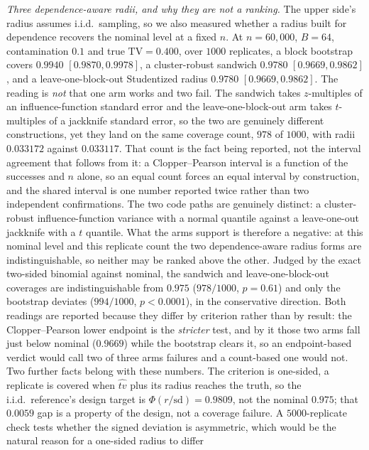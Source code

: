 \documentclass[sigconf,anonymous,review]{acmart}
\newcommand{\tv}{\mathrm{TV}}
\begin{document}
\emph{Three dependence-aware radii, and why they are not a ranking.} The
upper side's radius assumes i.i.d.\ sampling, so we also measured whether a
radius built for dependence recovers the nominal level at a fixed $n$. At $n{=}60{,}000$, $B{=}64$,
contamination $0.1$ and true $\tv = 0.400$, over $1000$ replicates, a block
bootstrap covers $0.9940$ $[0.9870, 0.9978]$, a cluster-robust sandwich $0.9780$
$[0.9669, 0.9862]$, and a leave-one-block-out Studentized radius $0.9780$
$[0.9669, 0.9862]$. The reading is \emph{not} that one arm works and two fail.
The sandwich takes $z$-multiples of an influence-function standard error and the
leave-one-block-out arm takes $t$-multiples of a jackknife standard error, so the
two are genuinely different constructions, yet they land on the same coverage
count, $978$ of $1000$, with radii $0.033172$ against $0.033117$. That count is
the fact being reported, not the interval agreement that follows from it: a
Clopper--Pearson interval is a function of the successes and $n$ alone, so an
equal count forces an equal interval by construction, and the shared interval is
one number reported twice rather than two independent confirmations. The two code
paths are genuinely distinct: a cluster-robust influence-function variance with
a normal quantile against a leave-one-out jackknife with a $t$ quantile. What
the arms support is therefore a negative: at this nominal level and this replicate
count the two dependence-aware radius forms are indistinguishable, so neither may
be ranked above the other. Judged by the exact two-sided binomial against nominal, the
sandwich and leave-one-block-out coverages are indistinguishable from $0.975$
($978/1000$, $p{=}0.61$) and only the bootstrap deviates ($994/1000$,
$p{<}0.0001$), in the conservative direction. Both readings are reported
because they differ by criterion rather than by result: the Clopper--Pearson
lower endpoint is the \emph{stricter} test, and by it those two arms fall just
below nominal ($0.9669$) while the bootstrap clears it, so an endpoint-based
verdict would call two of three arms failures and a count-based one would not. Two further facts belong with
these numbers. The criterion is one-sided, a replicate is covered when
$\widehat{tv}$ plus its radius reaches the truth, so the i.i.d.\ reference's
design target is $\Phi(r/\mathrm{sd}) = 0.9809$, not the nominal $0.975$; that
$0.0059$ gap is a property of the design, not a coverage failure. A $5000$-replicate check tests whether the signed deviation is
asymmetric, which would be the natural reason for a one-sided radius to differ
\end{document}
